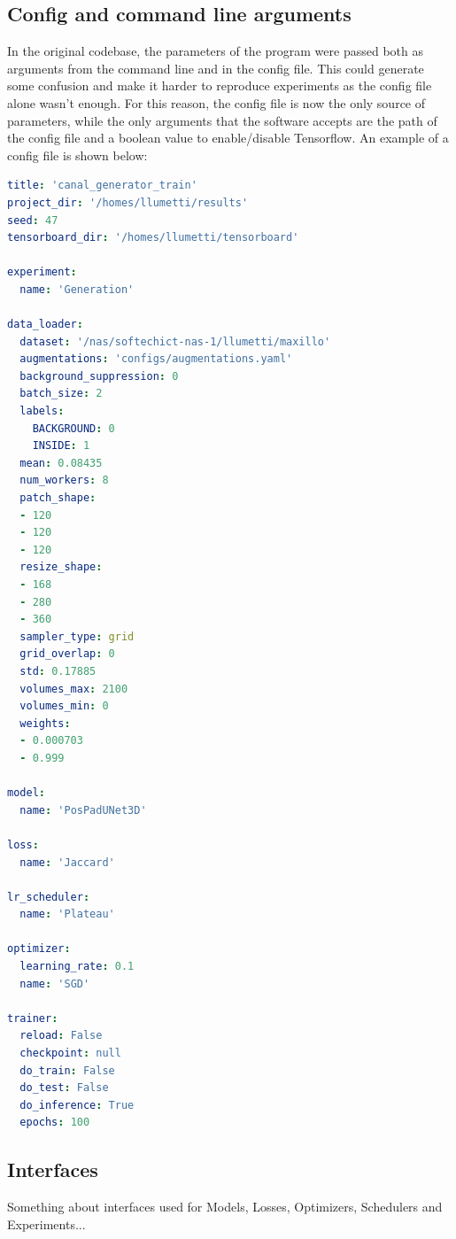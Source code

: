 \subsection{Config and command line arguments}
In the original codebase, the parameters of the program were passed both as
arguments from the command line and in the config file. This could generate some
confusion and make it harder to reproduce experiments as the config file alone
wasn't enough. For this reason, the config file is now the only source of
parameters, while the only arguments that the software accepts are the path of the
config file and a boolean value to enable/disable Tensorflow.
An example of a config file is shown below:

\begin{lstlisting}[language=YAML,breaklines=true,caption=Example of config file., label=union]
title: 'canal_generator_train'
project_dir: '/homes/llumetti/results'
seed: 47
tensorboard_dir: '/homes/llumetti/tensorboard'

experiment:
  name: 'Generation'

data_loader:
  dataset: '/nas/softechict-nas-1/llumetti/maxillo'
  augmentations: 'configs/augmentations.yaml'
  background_suppression: 0
  batch_size: 2
  labels:
    BACKGROUND: 0
    INSIDE: 1
  mean: 0.08435
  num_workers: 8
  patch_shape:
  - 120
  - 120
  - 120
  resize_shape:
  - 168
  - 280
  - 360
  sampler_type: grid
  grid_overlap: 0
  std: 0.17885
  volumes_max: 2100
  volumes_min: 0
  weights:
  - 0.000703
  - 0.999

model:
  name: 'PosPadUNet3D'

loss:
  name: 'Jaccard'

lr_scheduler:
  name: 'Plateau'

optimizer:
  learning_rate: 0.1
  name: 'SGD'

trainer:
  reload: False
  checkpoint: null
  do_train: False
  do_test: False
  do_inference: True
  epochs: 100
\end{lstlisting}

\subsection{Interfaces}
Something about interfaces used for Models, Losses, Optimizers, Schedulers and
Experiments...

